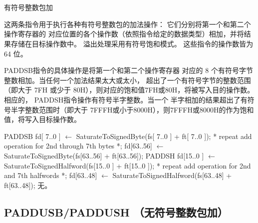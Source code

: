 \begin{instructionblk}
   \\
   \\
  {有符号整数包加}
  {这两条指令用于执行各种有符号整数包的加法操作： 它们分别将第一个和第二个操作寄存器的
  对应位置的各个操作数（依照指令给定的数据类型）相加，并将结果存储在目标操作数中。
  溢出处理采用有符号饱和模式。 这些指令的操作数皆为 64 位。

  PADDSB指令的具体操作是将第一个和第二个操作寄存器
  对应的 8 个有符号字节整数相加。当任何一个加法结果太大或太小，
  超出了一个有符号字节的整数范围（即大于 7FH 或少于
  80H），则对应的饱和值7FH或80H，将被写入目的操作数。
  相应的， PADDSH指令操作有符号半字整数。当一个
  半字相加的结果超出了有符号半字整数范围时（即大于
  7FFFH或小于8000H），则7FFFH或8000H的作为饱和值，将写入目标操作数。}
  {PADDSB \narrownewline
  fd[ 7..0 ]  $\leftarrow$ SaturateToSignedByte(fs[ 7..0 ] + ft[ 7..0 ]); \narrownewline
  * repeat add operation for 2nd through 7th bytes *; \narrownewline
  fd[63..56] $\leftarrow$ SaturateToSignedByte(fs[63..56] + ft[63..56]); \narrownewline \narrownewline
  PADDSH \narrownewline
  fd[15..0 ] $\leftarrow$ SaturateToSignedHalfword(fs[15..0 ] + ft[15..0 ]); \narrownewline
  * repeat add operation for 2nd and 7th halfwords *; \narrownewline
  fd[63..48] $\leftarrow$ SaturateToSignedHalfword(fs[63..48] + ft[63..48]);}
  {无。}
\end{instructionblk}

\subsection{PADDUSB/PADDUSH （无符号整数包加）}

